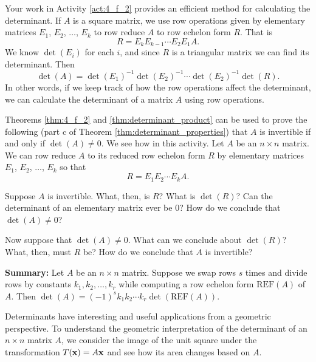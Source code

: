 Your work in Activity \ref{act:4_f_2} provides an efficient method for calculating the determinant. If $A$ is a square matrix, we use row operations given by elementary matrices $E_1$, $E_2$, $\ldots$, $E_k$ to row reduce $A$ to row echelon form $R$. That is
\[R = E_kE_{k-1} \cdots E_2E_1A.\]
We know $\det(E_i)$ for each $i$, and since $R$ is a triangular matrix we can find its determinant. Then
\[\det(A) = \det(E_1)^{-1}\det(E_2)^{-1} \cdots \det(E_2)^{-1}\det(R).\]
In other words, if we keep track of how the row operations affect the determinant, we can calculate the determinant of a matrix $A$ using row operations. 




\begin{activity} \label{act:4_f_2_b} Theorems \ref{thm:4_f_2} and \ref{thm:determinant_product} can be used to prove the following (part c of Theorem \ref{thm:determinant_properties}) that $A$ is invertible if and only if $\det(A) \neq 0$. We see how in this activity. Let $A$ be an $n \times n$ matrix. We can row reduce $A$ to its reduced row echelon form $R$ by elementary matrices $E_1$, $E_2$, $\ldots$, $E_k$ so that 
\[R = E_1E_2 \cdots E_kA.\]
\ba 
\item Suppose $A$ is invertible. What, then, is $R$? What is $\det(R)$? Can the determinant of an elementary matrix ever be $0$? How do we conclude that $\det(A) \neq 0$?
\item Now suppose that $\det(A) \neq 0$. What can we conclude about $\det(R)$? What, then, must $R$ be? How do we conclude that $A$ is invertible? 
\ea 
\end{activity}

\noindent \textbf{Summary: } Let $A$ be an $n\times n$ matrix. Suppose we swap rows $s$ times and divide rows by constants $k_1, k_2, \ldots, k_r$ while computing a row echelon form $\text{REF}(A)$ of $A$. Then $\det(A)=(-1)^s k_1 k_2\cdots k_r \det(\text{REF}(A))$.

\label{sec:det_geom}

Determinants have interesting and useful applications from a geometric perspective. To understand the geometric interpretation of the determinant of an $n\times n$ matrix $A$, we consider the image of the unit square under the transformation $T(\mathbf{x})=A\mathbf{x}$ and see how its area changes based on $A$.



